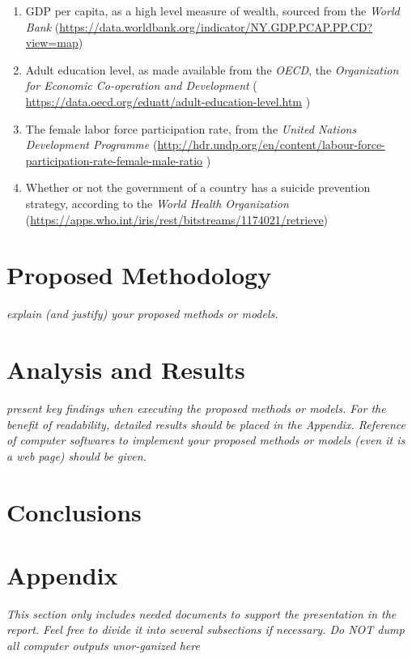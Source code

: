 \documentclass[]{article}
\begin{document}
\begin{enumerate}
\def\labelenumi{\arabic{enumi}.}
\item
  GDP per capita, as a high level measure of wealth, sourced from the
  \emph{World Bank}
  (\url{https://data.worldbank.org/indicator/NY.GDP.PCAP.PP.CD?view=map})
\item
  Adult education level, as made available from the \emph{OECD}, the
  \emph{Organization for Economic Co-operation and Development} (
  \url{https://data.oecd.org/eduatt/adult-education-level.htm} )
\item
  The female labor force participation rate, from the \emph{United
  Nations Development Programme}
  (\url{http://hdr.undp.org/en/content/labour-force-participation-rate-female-male-ratio}
  )
\item
  Whether or not the government of a country has a suicide prevention
  strategy, according to the \emph{World Health Organization}
  (\url{https://apps.who.int/iris/rest/bitstreams/1174021/retrieve})
\end{enumerate}

\section{Proposed Methodology}\label{proposed-methodology}

\emph{explain (and justify) your proposed methods or models.}

\section{Analysis and Results}\label{analysis-and-results}

\emph{present key findings when executing the proposed methods or
models. For the benefit of readability, detailed results should be
placed in the Appendix. Reference of computer softwares to implement
your proposed methods or models (even it is a web page) should be
given.}

\section{Conclusions}\label{conclusions}

\section{Appendix}\label{appendix}

\emph{This section only includes needed documents to support the
presentation in the report. Feel free to divide it into several
subsections if necessary. Do NOT dump all computer outputs unor-ganized
here}
\end{document}
